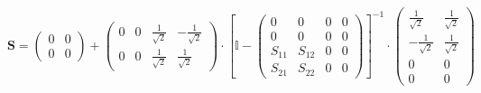\[ \mathbf{S} = \left(\begin{smallmatrix} 0 & 0 \\ 0 & 0
\end{smallmatrix}\right) + \left(\begin{smallmatrix} 0 & 0 &
\frac{1}{\sqrt{2}} & -\frac{1}{\sqrt{2}} \\ 0 & 0 & \frac{1}{\sqrt{2}}
& \frac{1}{\sqrt{2}} \end{smallmatrix}\right) \cdot \left[ \mathbb{I}
- \left(\begin{smallmatrix} 0 & 0 & 0 & 0 \\ 0 & 0 & 0 & 0 \\ S_{11} &
S_{12} & 0 & 0 \\ S_{21} & S_{22} & 0 & 0 \end{smallmatrix}\right)
\right]^{-1} \cdot\left(\begin{smallmatrix} \frac{1}{\sqrt{2}} &
\frac{1}{\sqrt{2}} \\ -\frac{1}{\sqrt{2}} & \frac{1}{\sqrt{2}} \\ 0 &
0 \\ 0 & 0 \end{smallmatrix}\right) \]
